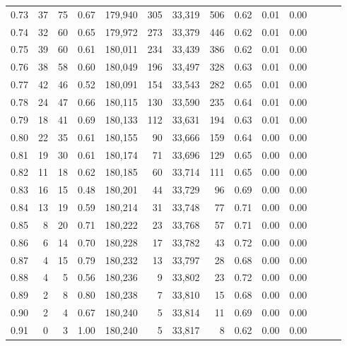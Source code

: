 \begin{tabular}{rrrrrrrrrrrrrr}
0.73 &     37 &     75 &  0.67 &  179,940 &      305 &  33,319 &     506 &  0.62 &  0.01 &      0.00 \\
0.74 &     32 &     60 &  0.65 &  179,972 &      273 &  33,379 &     446 &  0.62 &  0.01 &      0.00 \\
0.75 &     39 &     60 &  0.61 &  180,011 &      234 &  33,439 &     386 &  0.62 &  0.01 &      0.00 \\
0.76 &     38 &     58 &  0.60 &  180,049 &      196 &  33,497 &     328 &  0.63 &  0.01 &      0.00 \\
0.77 &     42 &     46 &  0.52 &  180,091 &      154 &  33,543 &     282 &  0.65 &  0.01 &      0.00 \\
0.78 &     24 &     47 &  0.66 &  180,115 &      130 &  33,590 &     235 &  0.64 &  0.01 &      0.00 \\
0.79 &     18 &     41 &  0.69 &  180,133 &      112 &  33,631 &     194 &  0.63 &  0.01 &      0.00 \\
0.80 &     22 &     35 &  0.61 &  180,155 &       90 &  33,666 &     159 &  0.64 &  0.00 &      0.00 \\
0.81 &     19 &     30 &  0.61 &  180,174 &       71 &  33,696 &     129 &  0.65 &  0.00 &      0.00 \\
0.82 &     11 &     18 &  0.62 &  180,185 &       60 &  33,714 &     111 &  0.65 &  0.00 &      0.00 \\
0.83 &     16 &     15 &  0.48 &  180,201 &       44 &  33,729 &      96 &  0.69 &  0.00 &      0.00 \\
0.84 &     13 &     19 &  0.59 &  180,214 &       31 &  33,748 &      77 &  0.71 &  0.00 &      0.00 \\
0.85 &      8 &     20 &  0.71 &  180,222 &       23 &  33,768 &      57 &  0.71 &  0.00 &      0.00 \\
0.86 &      6 &     14 &  0.70 &  180,228 &       17 &  33,782 &      43 &  0.72 &  0.00 &      0.00 \\
0.87 &      4 &     15 &  0.79 &  180,232 &       13 &  33,797 &      28 &  0.68 &  0.00 &      0.00 \\
0.88 &      4 &      5 &  0.56 &  180,236 &        9 &  33,802 &      23 &  0.72 &  0.00 &      0.00 \\
0.89 &      2 &      8 &  0.80 &  180,238 &        7 &  33,810 &      15 &  0.68 &  0.00 &      0.00 \\
0.90 &      2 &      4 &  0.67 &  180,240 &        5 &  33,814 &      11 &  0.69 &  0.00 &      0.00 \\
0.91 &      0 &      3 &  1.00 &  180,240 &        5 &  33,817 &       8 &  0.62 &  0.00 &      0.00 \\

\end{tabular}
